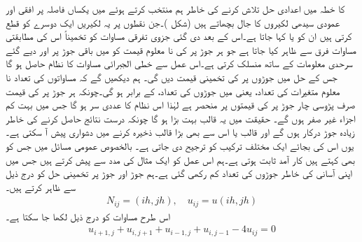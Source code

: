   کا خطہ  میں اعدادی حل تلاش کرنے کی خاطر  ہم  منتخب کرتے ہوئے  میں  یکساں  فاصلہ پر افقی اور عمودی سیدھی لکیروں کا جال بچھاتے ہیں (شکل )۔جن نقطوں پر یہ لکیریں ایک دوسرے کو قطع کرتی ہیں ان  کو   یا  کہا جاتا ہے۔اس کے بعد دی گئی جزوی تفرقی مساوات کو تخمیناً اس کی مطابقتی مساوات فرق سے ظاہر کیا جاتا ہے جو ہر جوڑ پر  کی نا معلوم قیمت کو  میں باقی جوڑ پر اور دیے گئے سرحدی معلومات کے ساتھ منسلک کرتی ہے۔اس عمل سے خطی الجبرائی مساوات کا نظام حاصل ہو گا جس کے حل  میں  جوڑوں پر  کی تخمینی قیمت دیں گی۔ ہم دیکھیں گے کہ مساواتوں کی تعداد نا معلوم متغیرات کی تعداد، یعنی  میں جوڑوں کی تعداد، کے برابر ہو گی۔چونکہ ہر جوڑ پر  کی قیمت صرف پڑوسی چار جوڑ پر  کی قیمتوں پر منحصر ہے لہٰذا اس نظام کا عددی سر  ہو گا جس میں بہت کم اجزاء غیر صفر ہوں گے۔ حقیقت میں یہ قالب بہت بڑا ہو گا چونکہ درست نتائج حاصل کرنے کی خاطر زیادہ جوڑ درکار ہوں گے اور  قالب یا اس سے بھی بڑا قالب ذخیرہ کرنے میں دشواری پیش آ سکتی ہے۔یوں اس کی بجائے ایک مختلف ترکیب کو ترجیح دی جاتی ہے۔ بالخصوص عمومی مسائل میں   جس کو  بھی کہتے ہیں کار آمد ثابت ہوتی ہے۔ہم اس عمل کو ایک مثال کی مدد سے پیش کرتے ہیں جس میں اپنی  آسانی کی خاطر جوڑوں کی تعداد کم رکھی گئی ہے۔ہم جوڑ اور جوڑ پر تخمینی حل کو درج ذیل سے ظاہر کرتے ہیں۔
\begin{align}\label{مساوات_اعدادی_جزوی_عمومی_د}
N_{ij}=(ih,jh),\quad u_{ij}=u(ih,jh)
\end{align}
اس طرح مساوات  کو درج ذیل لکھا جا سکتا ہے۔
\begin{align}\label{مساوات_اعدادی_جزوی_عمومی_ڈ}
u_{i+1,j}+u_{i,j+1}+u_{i-1,j}+u_{i,j-1}-4u_{ij}=0
\end{align}
%
